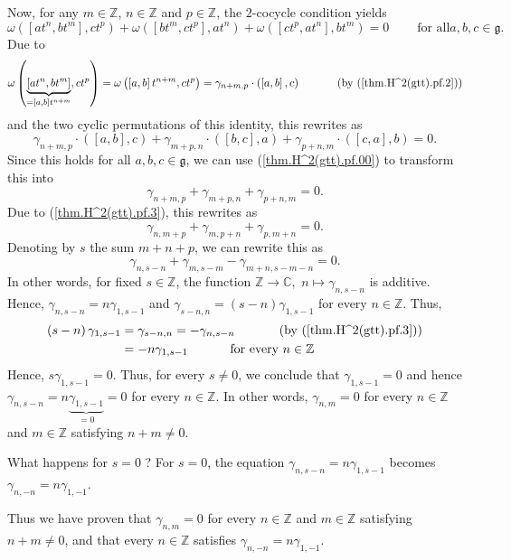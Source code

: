 \documentclass
[numbers=enddot,12pt,final,onecolumn,german,notitlepage]{scrartcl}%
\theoremstyle{definition}
\begin{document}
Now, for any $m\in\mathbb{Z}$, $n\in\mathbb{Z}$ and $p\in\mathbb{Z}$, the
$2$-cocycle condition yields%
\[
\omega\left(  \left[  at^{n},bt^{m}\right]  ,ct^{p}\right)  +\omega\left(
\left[  bt^{m},ct^{p}\right]  ,at^{n}\right)  +\omega\left(  \left[
ct^{p},at^{n}\right]  ,bt^{m}\right)  =0\ \ \ \ \ \ \ \ \ \ \text{for all
}a,b,c\in\mathfrak{g}.
\]
Due to%
\[
\omega\left(  \underbrace{\left[  at^{n},bt^{m}\right]  }_{=\left[
a,b\right]  t^{n+m}},ct^{p}\right)  =\omega\left(  \left[  a,b\right]
t^{n+m},ct^{p}\right)  =\gamma_{n+m,p}\cdot\left(  \left[  a,b\right]
,c\right)  \ \ \ \ \ \ \ \ \ \ \left(  \text{by (\ref{thm.H^2(gtt).pf.2}%
)}\right)
\]
and the two cyclic permutations of this identity, this rewrites as%
\[
\gamma_{n+m,p}\cdot\left(  \left[  a,b\right]  ,c\right)  +\gamma_{m+p,n}%
\cdot\left(  \left[  b,c\right]  ,a\right)  +\gamma_{p+n,m}\cdot\left(
\left[  c,a\right]  ,b\right)  =0.
\]
Since this holds for all $a,b,c\in\mathfrak{g}$, we can use
(\ref{thm.H^2(gtt).pf.00}) to transform this into%
\[
\gamma_{n+m,p}+\gamma_{m+p,n}+\gamma_{p+n,m}=0.
\]
Due to (\ref{thm.H^2(gtt).pf.3}), this rewrites as%
\[
\gamma_{n,m+p}+\gamma_{m,p+n}+\gamma_{p,m+n}=0.
\]
Denoting by $s$ the sum $m+n+p$, we can rewrite this as%
\[
\gamma_{n,s-n}+\gamma_{m,s-m}-\gamma_{m+n,s-m-n}=0.
\]
In other words, for fixed $s\in\mathbb{Z}$, the function $\mathbb{Z}%
\rightarrow\mathbb{C},$ $n\mapsto\gamma_{n,s-n}$ is additive. Hence,
$\gamma_{n,s-n}=n\gamma_{1,s-1}$ and $\gamma_{s-n,n}=\left(  s-n\right)
\gamma_{1,s-1}$ for every $n\in\mathbb{Z}$. Thus,
\begin{align*}
\left(  s-n\right)  \gamma_{1,s-1}  &  =\gamma_{s-n,n}=-\gamma_{n,s-n}%
\ \ \ \ \ \ \ \ \ \ \left(  \text{by (\ref{thm.H^2(gtt).pf.3})}\right) \\
&  =-n\gamma_{1,s-1}\ \ \ \ \ \ \ \ \ \ \text{for every }n\in\mathbb{Z}%
\end{align*}
Hence, $s\gamma_{1,s-1}=0$. Thus, for every $s\neq0$, we conclude that
$\gamma_{1,s-1}=0$ and hence $\gamma_{n,s-n}=n\underbrace{\gamma_{1,s-1}}%
_{=0}=0$ for every $n\in\mathbb{Z}$. In other words, $\gamma_{n,m}=0$ for
every $n\in\mathbb{Z}$ and $m\in\mathbb{Z}$ satisfying $n+m\neq0$.

What happens for $s=0$ ? For $s=0$, the equation $\gamma_{n,s-n}%
=n\gamma_{1,s-1}$ becomes $\gamma_{n,-n}=n\gamma_{1,-1}$.

Thus we have proven that $\gamma_{n,m}=0$ for every $n\in\mathbb{Z}$ and
$m\in\mathbb{Z}$ satisfying $n+m\neq0$, and that every $n\in\mathbb{Z}$
satisfies $\gamma_{n,-n}=n\gamma_{1,-1}$.
\end{document}
